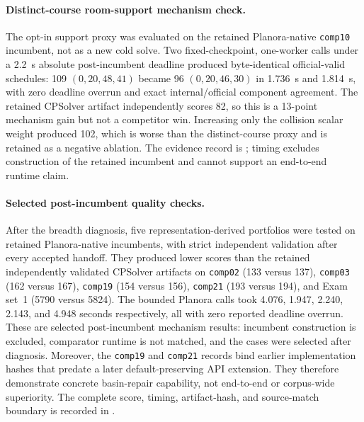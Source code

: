 \paragraph{Distinct-course room-support mechanism check.}
The opt-in support proxy was evaluated on the retained Planora-native \texttt{comp10} incumbent, not as a new cold solve.
Two fixed-checkpoint, one-worker calls under a 2.2~s absolute post-incumbent deadline produced byte-identical official-valid schedules: 109 $(0,20,48,41)$ became 96 $(0,20,46,30)$ in 1.736~s and 1.814~s, with zero deadline overrun and exact internal/official component agreement.
The retained CPSolver artifact independently scores 82, so this is a 13-point mechanism gain but not a competitor win.
Increasing only the collision scalar weight produced 102, which is worse than the distinct-course proxy and is retained as a negative ablation.
The evidence record is ; timing excludes construction of the retained incumbent and cannot support an end-to-end runtime claim.

\paragraph{Selected post-incumbent quality checks.}
After the breadth diagnosis, five representation-derived portfolios were tested on retained Planora-native incumbents, with strict independent validation after every accepted handoff.
They produced lower scores than the retained independently validated CPSolver artifacts on \texttt{comp02} (133 versus 137), \texttt{comp03} (162 versus 167), \texttt{comp19} (154 versus 156), \texttt{comp21} (193 versus 194), and Exam set~1 (5790 versus 5824).
The bounded Planora calls took 4.076, 1.947, 2.240, 2.143, and 4.948 seconds respectively, all with zero reported deadline overrun.
These are selected post-incumbent mechanism results: incumbent construction is excluded, comparator runtime is not matched, and the cases were selected after diagnosis.
Moreover, the \texttt{comp19} and \texttt{comp21} records bind earlier implementation hashes that predate a later default-preserving API extension.
They therefore demonstrate concrete basin-repair capability, not end-to-end or corpus-wide superiority.
The complete score, timing, artifact-hash, and source-match boundary is recorded in .

